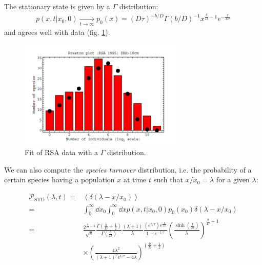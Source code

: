 \documentclass[../../main.tex]{subfiles}
\begin{document}
\medskip

The stationary state is given by a $\Gamma$ distribution:
\begin{align*}
    p(x,t|x_0,0) \xrightarrow[t \to \infty]{} p_{0}(x)=(D \tau)^{-b / D} \Gamma(b / D)^{-1} x^{\frac{b}{D}-1} e^{-\frac{x}{D \tau}}
\end{align*}
and agrees well with data (fig. \ref{fig:gamma-stat}).

\begin{figure}[H]
    \centering
    \includegraphics[width=0.7\textwidth]{gamma-stat.png}
    \caption{Fit of RSA data with a $\Gamma$ distribution.}
    \label{fig:gamma-stat}
\end{figure}

We can also compute the \textit{species turnover} distribution, i.e. the probability of a certain species having a population $x$ at time $t$ such that $x/x_0 = \lambda$ for a given $\lambda$:

\begin{align} \nonumber
    \mathcal{P}_{\mathrm{STD}}(\lambda, t)=&\left\langle\delta\left(\lambda-x / x_{0}\right)\right\rangle \\ \nonumber
    =& \int_{0}^{\infty} \dd{x_0} \int_{0}^{\infty} \dd{x} p\left(x, t | x_{0}, 0\right) p_{0}\left(x_{0}\right) \delta\left(\lambda-x / x_{0}\right) \\
    \nonumber
    =& \frac{2^{\frac{b}{D}-1}}{\sqrt{\pi}} \frac{\Gamma\left(\frac{b}{D} + \frac{1}{2}  \right)}{\Gamma\left(\frac{b}{D} \right)} \frac{(\lambda + 1)}{\lambda} \frac{(e^{t/\tau}) e^{\frac{b}{2D}}}{1 - e^{-t/\tau}} \left(\frac{\sinh \left(\frac{t}{2 \tau} \right)}{\lambda} \right)^{\frac{b}{D}+1 }   \\ \label{eqn:species-turnover}
    & \times\left(\frac{4 \lambda^{2}}{(\lambda+1)^{2} e^{t / \tau}-4 \lambda}\right)^{\left(\frac{b}{D} + \frac{1}{2} \right)}
\end{align}
\end{document}
